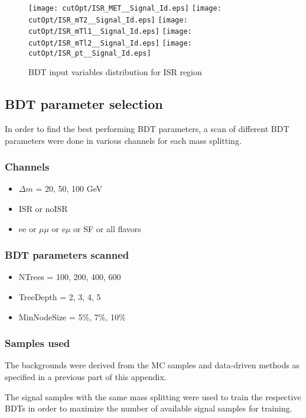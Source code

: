 \begin{figure}
\texttt{[image: cutOpt/ISR\_MET\_\_Signal\_Id.eps]}
\texttt{[image: cutOpt/ISR\_mT2\_\_Signal\_Id.eps]}
\texttt{[image: cutOpt/ISR\_mTl1\_\_Signal\_Id.eps]}
\texttt{[image: cutOpt/ISR\_mTl2\_\_Signal\_Id.eps]}
\texttt{[image: cutOpt/ISR\_pt\_\_Signal\_Id.eps]}
\caption{BDT input variables distribution for ISR region}
\label{fig:BDT_ISR_input2}
\end{figure}

\FloatBarrier
\subsection{BDT parameter selection}
In order to find the best performing BDT parameters, a scan of different BDT parameters were done in various channels for each mass splitting. 

\subsubsection*{Channels}
\begin{itemize}
\item $\Delta m$ = 20, 50, 100 GeV
\item ISR or noISR
\item ee or $\mu\mu$ or e$\mu$ or SF or all flavors
\end{itemize}

\subsubsection*{BDT parameters scanned}
\begin{itemize}
\item NTrees = 100, 200, 400, 600
\item TreeDepth = 2, 3, 4, 5
\item MinNodeSize = 5\%, 7\%, 10\%
\end{itemize}

\subsubsection*{Samples used}
The backgrounds were derived from the MC samples and data-driven methods as specified in a previous part of this appendix. 

The signal samples with the same mass splitting were used to train the respective BDTs in order to maximize the number of available signal samples for training.

